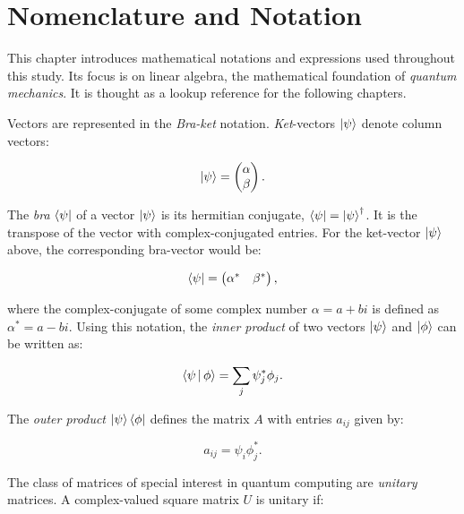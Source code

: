 \chapter{Nomenclature and Notation}

This chapter introduces mathematical notations and expressions used throughout 
this study. Its focus is on linear algebra, the mathematical foundation of 
\textit{quantum mechanics}. It is thought as a lookup reference for the following chapters.

Vectors are represented in the \textit{Bra-ket} notation. \textit{Ket}-vectors $\Ket{\psi}$ denote 
column vectors:

\begin{equation}
   \Ket{\psi} = \begin{pmatrix} \alpha \\ \beta \end{pmatrix}.
\end{equation}

The \textit{bra} $\Bra{\psi}$ of a vector $\Ket{\psi}$ is its hermitian conjugate, 
$\Bra{\psi} = \Ket{\psi}^{\dagger}$. It is the transpose of the vector with complex-conjugated 
entries. For the ket-vector $\Ket{\psi}$ above, the corresponding bra-vector would be:

\begin{equation}
   \Bra{\psi} = \begin{pmatrix}
      \alpha^* & \beta^*
   \end{pmatrix},
\end{equation}

where the complex-conjugate of some complex number $\alpha = a + b i$ is 
defined as $\alpha^* = a - b i$. Using this notation, the \textit{inner product} of two vectors
$\Ket{\psi}$ and $\Ket{\phi}$ can be written as:

\begin{equation}
   \Braket{\psi | \phi} = \sum_j \psi_j^* \phi_j.
\end{equation}

The \textit{outer product} $\Ket{\psi} \Bra{\phi}$ defines the matrix $A$ with entries 
$a_{ij}$ given by:

\begin{equation}
   a_{ij} = \psi_i \phi^*_j.
\end{equation}

The class of matrices of special interest in quantum computing are \textit{unitary} matrices.
A complex-valued square matrix $U$ is unitary if:

